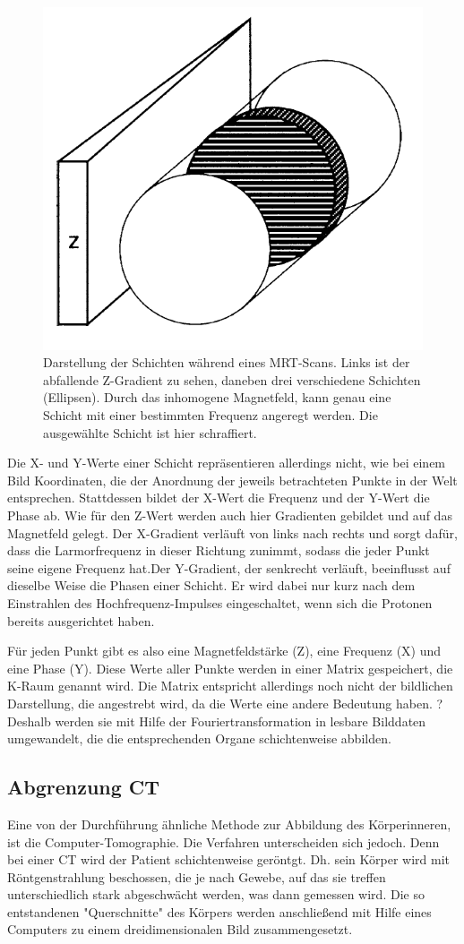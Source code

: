 \begin{figure}
	\centering
	\includegraphics[width=0.3\linewidth]{images/zGradientMrt.png}
	\caption{Darstellung der Schichten während eines MRT-Scans. Links ist der abfallende Z-Gradient zu sehen, daneben drei verschiedene Schichten (Ellipsen). Durch das inhomogene Magnetfeld, kann genau eine Schicht mit einer bestimmten Frequenz angeregt werden. Die ausgewählte Schicht ist hier schraffiert. \cite{weishaupt09}}
	\label{img:zGradient}
\end{figure}


Die X- und Y-Werte einer Schicht repräsentieren allerdings nicht, wie bei einem Bild Koordinaten, die der Anordnung der jeweils betrachteten Punkte in der Welt entsprechen. Stattdessen bildet der X-Wert die Frequenz und der Y-Wert die Phase ab. Wie für den Z-Wert werden auch hier Gradienten gebildet und auf das Magnetfeld gelegt. Der X-Gradient verläuft von links nach rechts und sorgt dafür, dass die Larmorfrequenz in dieser Richtung zunimmt, sodass die jeder Punkt seine eigene Frequenz hat.Der Y-Gradient, der senkrecht verläuft, beeinflusst auf dieselbe Weise die Phasen einer Schicht. Er wird dabei nur kurz nach dem Einstrahlen des Hochfrequenz-Impulses eingeschaltet, wenn sich die Protonen bereits ausgerichtet haben.

Für jeden Punkt gibt es also eine Magnetfeldstärke (Z), eine Frequenz (X) und eine Phase (Y). Diese Werte aller Punkte werden in einer Matrix gespeichert, die K-Raum genannt wird. Die Matrix entspricht allerdings noch nicht der bildlichen Darstellung, die angestrebt wird, da die Werte eine andere Bedeutung haben. ? Deshalb werden sie mit Hilfe der Fouriertransformation in lesbare Bilddaten umgewandelt, die die entsprechenden Organe schichtenweise abbilden. 
\cite{weishaupt09}

\subsection{Abgrenzung CT}
Eine von der Durchführung ähnliche Methode zur Abbildung des Körperinneren, ist die Computer-Tomographie. Die Verfahren unterscheiden sich jedoch. Denn bei einer CT wird der Patient schichtenweise geröntgt. Dh. sein Körper wird mit Röntgenstrahlung beschossen, die je nach Gewebe, auf das sie treffen unterschiedlich stark abgeschwächt werden, was dann gemessen wird. Die so entstandenen "Querschnitte" des Körpers werden anschließend mit Hilfe eines Computers zu einem dreidimensionalen Bild zusammengesetzt. 

